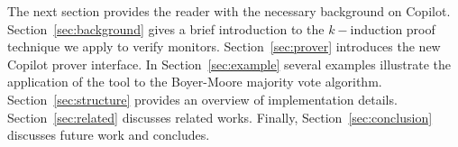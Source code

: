 The next section provides the reader with the necessary background on
Copilot. Section~\ref{sec:background} gives a brief introduction to
the $k-$induction proof technique we apply to verify
monitors. Section~\ref{sec:prover} introduces the new Copilot prover
interface. In Section~\ref{sec:example} several examples illustrate
the application of the tool to the Boyer-Moore majority vote
algorithm. Section~\ref{sec:structure} provides an overview of
implementation details. Section~\ref{sec:related} discusses related
works. Finally, Section~\ref{sec:conclusion}
discusses future work and concludes.



  







